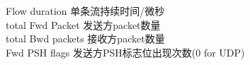     
Flow duration  单条流持续时间/微秒 \\
total Fwd Packet		发送方packet数量 \\
total Bwd packets		接收方packet数量 \\
Fwd PSH flags			发送方PSH标志位出现次数(0 for UDP) \\
